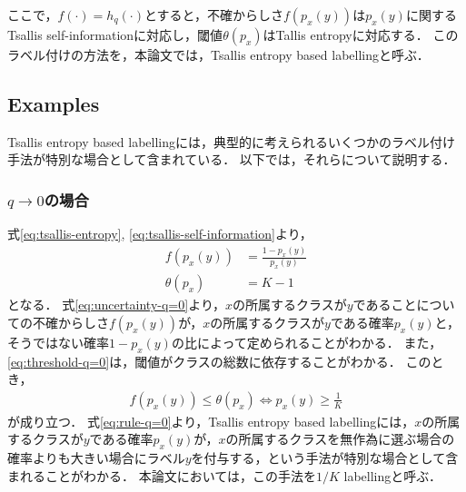 \documentclass[a4paper,conference]{IEEEtran}
\begin{document}
ここで，$f(\cdot)=h_{q}(\cdot)$とすると，不確からしさ$f(p_{x}(y))$は$p_{x}(y)$に関するTsallis self-informationに対応し，閾値$\theta(p_{x})$はTallis entropyに対応する．
このラベル付けの方法を，本論文では，Tsallis entropy based labellingと呼ぶ．

\subsection{Examples}\label{subsec:example_models}

Tsallis entropy based labellingには，典型的に考えられるいくつかのラベル付け手法が特別な場合として含まれている．
以下では，それらについて説明する．

\subsubsection{$q \rightarrow 0$の場合}
式\eqref{eq:tsallis-entropy}, \eqref{eq:tsallis-self-information}より，
\begin{align}
    f(p_{x}(y)) &= \frac{1-p_{x}(y)}{p_{x}(y)}\label{eq:uncertainty-q=0}\\
    \theta(p_{x}) &= K -1\label{eq:threshold-q=0}
\end{align}
となる．
式\eqref{eq:uncertainty-q=0}より，$x$の所属するクラスが$y$であることについての不確からしさ$f(p_{x}(y))$が，$x$の所属するクラスが$y$である確率$p_{x}(y)$と，そうではない確率$1-p_{x}(y)$の比によって定められることがわかる．
また，\eqref{eq:threshold-q=0}は，閾値がクラスの総数に依存することがわかる．
このとき，
\begin{align}
    f(p_{x}(y)) \le \theta(p_{x}) \Leftrightarrow p_{x}(y) \ge \frac{1}{K}\label{eq:rule-q=0}
\end{align}
が成り立つ．
式\eqref{eq:rule-q=0}より，Tsallis entropy based labellingには，$x$の所属するクラスが$y$である確率$p_{x}(y)$が，$x$の所属するクラスを無作為に選ぶ場合の確率よりも大きい場合にラベル$y$を付与する，という手法が特別な場合として含まれることがわかる．
本論文においては，この手法を$1/K$ labellingと呼ぶ．
\end{document}
